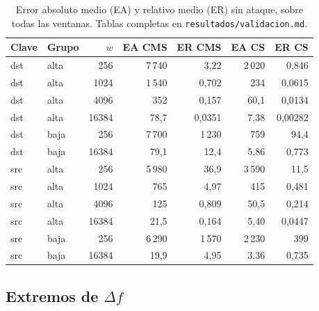 \documentclass[11pt]{article}
\newcommand{\code}[1]{\texttt{#1}}
\begin{document}
\begin{table}[H]
\centering\small
\caption{Error absoluto medio (EA) y relativo medio (ER) sin ataque, sobre todas las ventanas. Tablas completas en \code{resultados/validacion.md}.}
\label{tab:validacion}
\begin{tabular}{llrrrrr}
\toprule
Clave & Grupo & $w$ & EA CMS & ER CMS & EA CS & ER CS \\
\midrule
dst & alta & 256   & 7\,740 & 3,22   & 2\,020 & 0,846 \\
dst & alta & 1024  & 1\,540 & 0,702  & 234    & 0,0615 \\
dst & alta & 4096  & 352    & 0,157  & 60,1   & 0,0134 \\
dst & alta & 16384 & 78,7   & 0,0351 & 7,38   & 0,00282 \\
\addlinespace
dst & baja & 256   & 7\,700 & 1\,230 & 759    & 94,4 \\
dst & baja & 16384 & 79,1   & 12,4   & 5,86   & 0,773 \\
\addlinespace
src & alta & 256   & 5\,980 & 36,9   & 3\,590 & 11,5 \\
src & alta & 1024  & 765    & 4,97   & 415    & 0,481 \\
src & alta & 4096  & 125    & 0,809  & 50,5   & 0,214 \\
src & alta & 16384 & 21,5   & 0,164  & 5,40   & 0,0447 \\
\addlinespace
src & baja & 256   & 6\,290 & 1\,570 & 2\,230 & 399 \\
src & baja & 16384 & 19,9   & 4,95   & 3,36   & 0,735 \\
\bottomrule
\end{tabular}
\end{table}

\subsection{Extremos de $\Delta f$}
\end{document}
